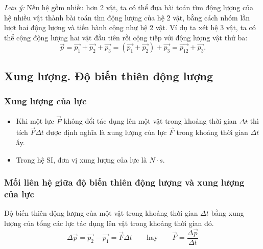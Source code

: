 \begin{itemize}
	\textit{Lưu ý:} Nếu hệ gồm nhiều hơn 2 vật, ta có thể đưa bài toán tìm động lượng của hệ nhiều vật thành bài toán tìm động lượng của hệ 2 vật, bằng cách nhóm lần lượt hai động lượng và tiến hành cộng như hệ 2 vật.	Ví dụ ta xét hệ 3 vật, ta có thể cộng động lượng hai vật đầu tiên rồi cộng tiếp với động lượng vật thứ ba:
	\begin{equation*}
		\vec{p}=\vec{p_1}+ \vec{p_2}+ \vec{p_3} = (\vec{p_1}+ \vec{p_2}) + \vec{p_3} = \vec{p_{12}} + \vec{p_3}.
	\end{equation*}
	
	
	
\end{itemize}
\subsection{Xung lượng. Độ biến thiên động lượng}
\subsubsection{Xung lượng của lực}
\begin{itemize}
	\item Khi một lực $\vec{F}$ không đổi tác dụng lên một vật trong khoảng thời gian $\Delta t$ thì tích $\vec{F} \Delta t$ được định nghĩa là xung lượng của lực $\vec{F}$ trong khoảng thời gian $\Delta t$ ấy. 
	\item Trong hệ SI, đơn vị xung lượng của lực là $N \cdot s$.
\end{itemize}
\subsubsection{Mối liên hệ giữa độ biến thiên động lượng và xung lượng của lực}
Độ biến thiên động lượng của một vật trong khoảng thời gian $\Delta t$ bằng xung lượng của tổng các lực tác dụng lên vật trong khoảng thời gian đó.
\begin{equation*}
	\Delta \vec{p}=\vec{p_2} - \vec{p_1} =\vec{F} \Delta t \qquad\text{hay}\qquad \vec{F}=\dfrac{\Delta\vec{p}}{\Delta t}
\end{equation*}
